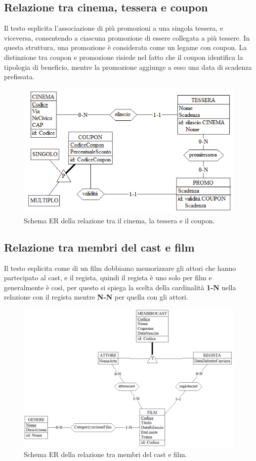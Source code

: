 \documentclass[a4paper,12pt]{report}
\begin{document}
	\subsection{Relazione tra cinema, tessera e coupon}
	Il testo esplicita l'associazione di più promozioni a una singola tessera, e viceversa, consentendo a ciascuna promozione di essere collegata a più tessere. In questa struttura, una promozione è considerata come un legame con coupon. La distinzione tra coupon e promozione risiede nel fatto che il coupon identifica la tipologia di beneficio, mentre la promozione aggiunge a esso una data di scadenza prefissata.
	\begin{figure}[H]
		\centering
		\includegraphics[width=0.7\linewidth]{ER/cinetesseracoupon.png}
		\caption{Schema ER della relazione tra il cinema, la tessera e il coupon.}
	\end{figure}
	\subsection{Relazione tra membri del cast e film}
	Il testo esplicita come di un film dobbiamo memorizzare gli attori che hanno partecipato al cast, e il regista, quindi il regista è uno solo per film e generalmente è così, per questo si spiega la scelta della cardinalità \textbf{1-N} nella relazione con il regista mentre \textbf{N-N} per quella con gli attori.
	\begin{figure}[H]
		\centering
		\includegraphics[width=450pt]{ER/filmcast.png}
		\caption{Schema ER della relazione tra membri del cast e film.}
	\end{figure}
\end{document}
